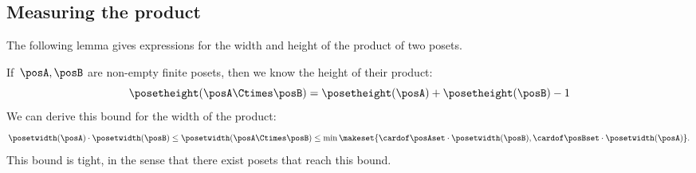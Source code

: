 \subsection{Measuring the product}
The following lemma gives expressions for the width and height of the product of two posets.

\begin{widepar}
    \begin{lemma}
        \label{lem:measuring-product}
        If~$\posA,\posB$ are non-empty finite posets, then we know the height of their product:
        \begin{equation}
            \posetheight(\posA\Ctimes \posB) = \posetheight(\posA)+\posetheight(\posB)-1
            \label{eq:bound-height}
        \end{equation}
        We can derive this bound for the width of the product:
        \begin{equation}
            \posetwidth(\posA) \cdot \posetwidth(\posB)
            \leq \posetwidth(\posA\Ctimes \posB)
            \leq \min \makeset{
                \cardof \posAset  \cdot \posetwidth(\posB),\cardof \posBset   \cdot \posetwidth(\posA)
            }.
            \label{eq:bound-width}
        \end{equation}
        This bound is tight, in the sense that there exist posets that reach this bound.
    \end{lemma}
\end{widepar}

